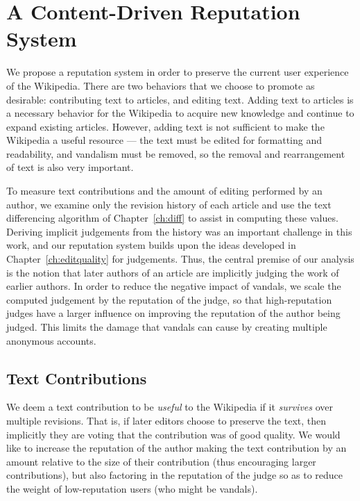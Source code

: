 \section{A Content-Driven Reputation System}

We propose a  reputation system in
order to preserve the current user experience of the Wikipedia.
There are two behaviors that we choose to promote as desirable:
contributing text to articles, and editing text.
Adding text to articles is a necessary behavior for the Wikipedia
to acquire new knowledge and continue to expand existing articles.
However, adding text is not sufficient to make the Wikipedia a
useful resource --- the text must be edited for formatting and
readability, and vandalism must be removed, so the removal and
rearrangement of text is also very important.

To measure text contributions and the amount of editing performed
by an author, we examine only the revision history of each article
and use the text differencing algorithm of Chapter~\ref{ch:diff} to
assist in computing these values.
Deriving implicit judgements from the history was an important
challenge in this work, and our reputation system builds upon
the ideas developed in Chapter~\ref{ch:editquality} for judgements.
Thus, the central premise of our analysis is the notion that later
authors of an article are implicitly judging the work of earlier authors.
In order to reduce the negative impact of vandals, we scale the
computed judgement by the reputation of the judge, so that high-reputation
judges have a larger influence on improving the reputation of the
author being judged.
This limits the damage that vandals can cause by creating multiple
anonymous accounts.

\subsection{Text Contributions}

We deem a text contribution to be \textit{useful} to the Wikipedia
if it \textit{survives} over multiple revisions.
That is, if later editors choose to preserve the text, then
implicitly they are voting that the contribution was of good
quality.
We would like to increase the reputation of the author making
the text contribution by an amount relative to the size of their
contribution (thus encouraging larger contributions),
but also factoring in the reputation of the judge so as to reduce
the weight of low-reputation users (who might be vandals).

